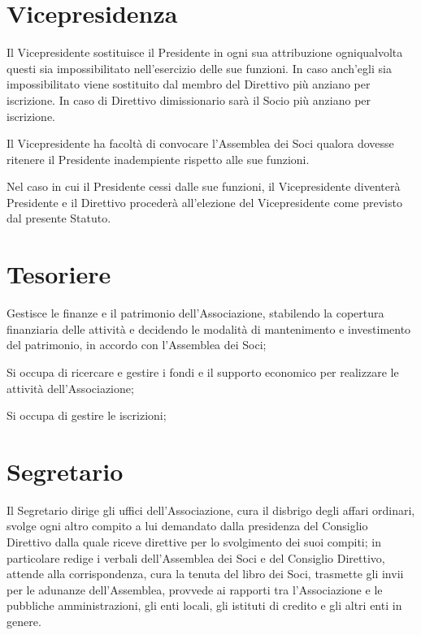 \documentclass[legalpaper, 11pt]{exam}
\let\tempone\enumerate
\let\temptwo\endenumerate
\renewenvironment{enumerate}{\tempone\addtolength{\itemsep}{-0.45\baselineskip}}{\temptwo}
\begin{document}
{\section{Vicepresidenza}
\begin{enumerate}
 \item Il Vicepresidente sostituisce il Presidente in ogni sua attribuzione ogniqualvolta questi sia impossibilitato nell’esercizio delle sue funzioni. In caso anch'egli sia impossibilitato viene sostituito dal membro del Direttivo più anziano per iscrizione. In caso di Direttivo dimissionario sarà il Socio più anziano per iscrizione.
 \item Il Vicepresidente ha facoltà di convocare l’Assemblea dei Soci qualora dovesse ritenere il Presidente inadempiente rispetto alle sue funzioni.
 \item Nel caso in cui il Presidente cessi dalle sue funzioni, il Vicepresidente diventerà Presidente e il Direttivo procederà all’elezione del Vicepresidente come previsto dal presente Statuto.
\end{enumerate}

\section{Tesoriere}
\begin{enumerate}
 \item Gestisce le finanze e il patrimonio dell’Associazione, stabilendo la copertura finanziaria delle attività e decidendo le modalità di mantenimento e investimento del patrimonio, in accordo con l’Assemblea dei Soci;
 \item Si occupa di ricercare e gestire i fondi e il supporto economico per realizzare le attività dell’Associazione;
 \item Si occupa di gestire le iscrizioni;
\end{enumerate}

\section{Segretario}
\begin{enumerate}
 \item Il Segretario dirige gli uffici dell’Associazione, cura il disbrigo degli affari ordinari, svolge ogni altro compito a lui demandato dalla presidenza del Consiglio Direttivo dalla quale riceve direttive per lo svolgimento dei suoi compiti; in particolare redige i verbali dell’Assemblea dei Soci e del Consiglio Direttivo, attende alla corrispondenza, cura la tenuta del libro dei Soci, trasmette gli invii per le adunanze dell’Assemblea, provvede ai rapporti tra l’Associazione e le pubbliche amministrazioni, gli enti locali, gli istituti di credito e gli altri enti in genere.
\end{enumerate}

}
\end{document}
